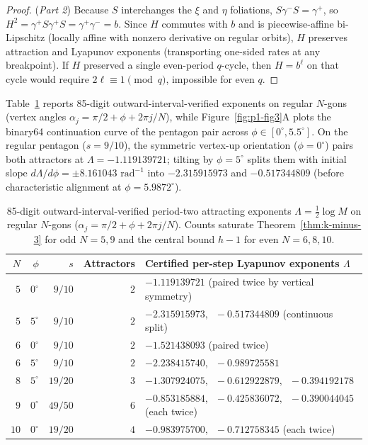 \documentclass[11pt,reqno]{amsart}
\theoremstyle{definition}
\theoremstyle{remark}
\begin{document}
\begin{proof}
(\emph{Part 2}) Because $S$ interchanges the $\xi$ and $\eta$ foliations, $S \gamma^- S = \gamma^+$, so $H^2 = \gamma^+ S \gamma^+ S = \gamma^+ \gamma^- = b$. Since $H$ commutes with $b$ and is piecewise-affine bi-Lipschitz (locally affine with nonzero derivative on regular orbits), $H$ preserves attraction and Lyapunov exponents (transporting one-sided rates at any breakpoint). If $H$ preserved a single even-period $q$-cycle, then $H = b^\ell$ on that cycle would require $2\ell \equiv 1 \pmod{q}$, impossible for even $q$.
\end{proof}

Table~\ref{tab:regular-multi} reports 85-digit outward-interval-verified exponents on regular $N$-gons (vertex angles $\alpha_j = \pi/2 + \phi + 2\pi j/N$), while Figure~\ref{fig:p1-fig3}A plots the binary64 continuation curve of the pentagon pair across $\phi \in [0^\circ, 5.5^\circ]$. On the regular pentagon ($s = 9/10$), the symmetric vertex-up orientation ($\phi = 0^\circ$) pairs both attractors at $\Lambda = -1.119139721$; tilting by $\phi = 5^\circ$ splits them with initial slope $d\Lambda/d\phi = \pm 8.161043\text{ rad}^{-1}$ into $-2.315915973$ and $-0.517344809$ (before characteristic alignment at $\phi = 5.9872^\circ$).

\begin{table}[ht]
\centering
\caption{85-digit outward-interval-verified period-two attracting exponents $\Lambda = \frac{1}{2}\log M$ on regular $N$-gons ($\alpha_j = \pi/2 + \phi + 2\pi j/N$). Counts saturate Theorem~\ref{thm:k-minus-3} for odd $N=5,9$ and the central bound $h-1$ for even $N=6,8,10$.}
\label{tab:regular-multi}
\footnotesize
\begin{tabular}{rrrrl}
\toprule
$N$ & $\phi$ & $s$ & Attractors & Certified per-step Lyapunov exponents $\Lambda$ \\
\midrule
$5$ & $0^\circ$ & $9/10$ & $2$ & $-1.119139721$ (paired twice by vertical symmetry) \\
$5$ & $5^\circ$ & $9/10$ & $2$ & $-2.315915973,\;\; -0.517344809$ (continuous split) \\
$6$ & $0^\circ$ & $9/10$ & $2$ & $-1.521438093$ (paired twice) \\
$6$ & $5^\circ$ & $9/10$ & $2$ & $-2.238415740,\;\; -0.989725581$ \\
$8$ & $5^\circ$ & $19/20$ & $3$ & $-1.307924075,\;\; -0.612922879,\;\; -0.394192178$ \\
$9$ & $0^\circ$ & $49/50$ & $6$ & $-0.853185884,\;\; -0.425836072,\;\; -0.390044045$ (each twice) \\
$10$ & $0^\circ$ & $19/20$ & $4$ & $-0.983975700,\;\; -0.712758345$ (each twice) \\
\bottomrule
\end{tabular}
\end{table}
\end{document}

